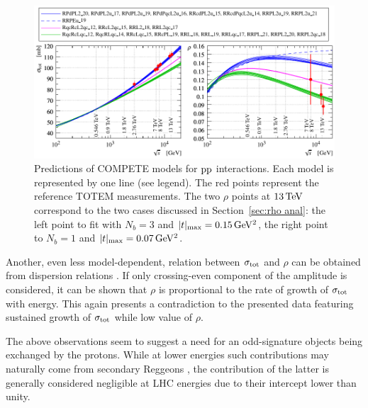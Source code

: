 \begin{figure}
\vskip-5mm
\begin{center}
\includegraphics{fig/compete_bands_si_tot_rho.pdf}
\caption{%
Predictions of COMPETE models \cite{compete-details} for $\rm pp$ interactions. Each model is represented by one line (see legend). The red points represent the reference TOTEM measurements. The two $\rho$ points at $13\,{\rm TeV}$ correspond to the two cases discussed in Section~\ref{sec:rho anal}: the left point to fit with $N_b=3$ and $|t|_{\rm max} = 0.15\,{\rm GeV^2}$, the right point to $N_b=1$ and $|t|_{\rm max} = 0.07\,{\rm GeV^2}$.
}
\label{fig:comp bands}
\end{center}
\end{figure}


Another, even less model-dependent, relation between $\sigma_{\rm tot}$ and $\rho$ can be obtained from dispersion relations . If only crossing-even component of the amplitude is considered, it can be shown that $\rho$ is proportional to the rate of growth of $\sigma_{\rm tot}$ with energy. This again presents a contradiction to the presented data featuring sustained growth of $\sigma_{\rm tot}$ while low value of $\rho$.

The above observations seem to suggest a need for an odd-signature objects being exchanged by the protons. While at lower energies such contributions may naturally come from secondary Reggeons , the contribution of the latter is generally considered negligible at LHC energies due to their intercept lower than unity.

